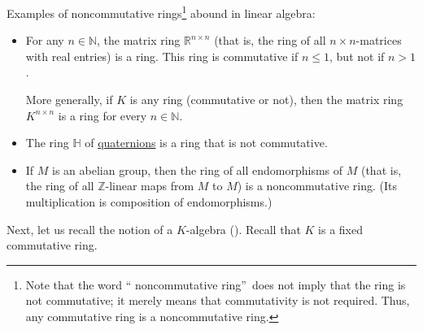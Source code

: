 Examples of noncommutative rings\footnote{Note that the word \textquotedblleft
noncommutative ring\textquotedblright\ does not imply that the ring is not
commutative; it merely means that commutativity is not required. Thus, any
commutative ring is a noncommutative ring.} abound in linear algebra:

\begin{itemize}
\item For any $n\in\mathbb{N}$, the matrix ring $\mathbb{R}^{n\times n}$ (that
is, the ring of all $n\times n$-matrices with real entries) is a ring. This
ring is commutative if $n\leq1$, but not if $n>1$.

More generally, if $K$ is any ring (commutative or not), then the matrix ring
$K^{n\times n}$ is a ring for every $n\in\mathbb{N}$.

\item The ring $\mathbb{H}$ of
\href{https://en.wikipedia.org/wiki/Quaternion}{quaternions} is a ring that is
not commutative.

\item If $M$ is an abelian group, then the ring of all endomorphisms of $M$
(that is, the ring of all $\mathbb{Z}$-linear maps from $M$ to $M$) is a
noncommutative ring. (Its multiplication is composition of endomorphisms.)
\end{itemize}

Next, let us recall the notion of a $K$-algebra (\cite[\S 3.11]{23wa}). Recall
that $K$ is a fixed commutative ring.

